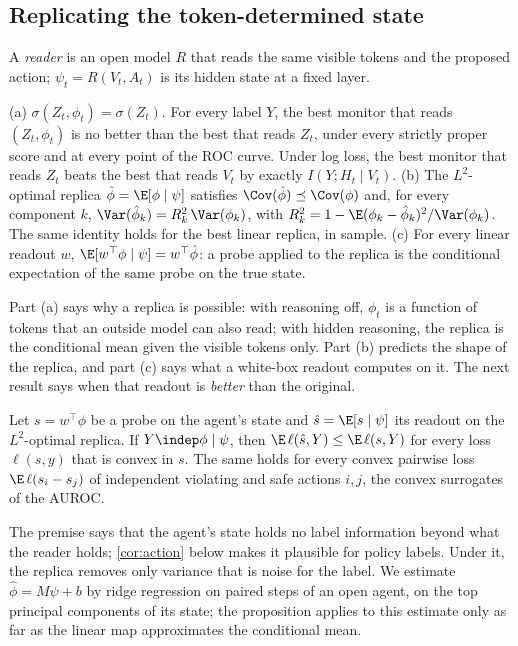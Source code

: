 \subsection{Replicating the token-determined state}
A \emph{reader} is an open model $R$ that reads the same visible tokens and the proposed action; $\psi_t=R(V_t,A_t)$ is its hidden state at a fixed layer.
\begin{proposition}\label{prop:replica}
(a) $\sigma(Z_t,\phi_t)=\sigma(Z_t)$. For every label $Y$, the best monitor that reads $(Z_t,\phi_t)$ is no better than the best that reads $Z_t$, under every strictly proper score and at every point of the ROC curve. Under log loss, the best monitor that reads $Z_t$ beats the best that reads $V_t$ by exactly $I(Y;H_t\mid V_t)$.
(b) The $L^2$-optimal replica $\hat\phi=\E[\phi\mid\psi]$ satisfies $\Cov(\hat\phi)\preceq\Cov(\phi)$ and, for every component $k$, $\Var(\hat\phi_k)=R^2_k\,\Var(\phi_k)$, with $R^2_k=1-\E(\phi_k-\hat\phi_k)^2/\Var(\phi_k)$. The same identity holds for the best linear replica, in sample.
(c) For every linear readout $w$, $\E[w^\top\phi\mid\psi]=w^\top\hat\phi$: a probe applied to the replica is the conditional expectation of the same probe on the true state.
\end{proposition}
Part (a) says why a replica is possible: with reasoning off, $\phi_t$ is a function of tokens that an outside model can also read; with hidden reasoning, the replica is the conditional mean given the visible tokens only. Part (b) predicts the shape of the replica, and part (c) says what a white-box readout computes on it. The next result says when that readout is \emph{better} than the original.
\begin{proposition}\label{prop:rb}
Let $s=w^\top\phi$ be a probe on the agent's state and $\hat s=\E[s\mid\psi]$ its readout on the $L^2$-optimal replica. If $Y\indep\phi\mid\psi$, then $\E\,\ell(\hat s,Y)\le\E\,\ell(s,Y)$ for every loss $\ell(s,y)$ that is convex in $s$. The same holds for every convex pairwise loss $\E\,\ell(s_i-s_j)$ of independent violating and safe actions $i,j$, the convex surrogates of the AUROC.
\end{proposition}
The premise says that the agent's state holds no label information beyond what the reader holds; \cref{cor:action} below makes it plausible for policy labels. Under it, the replica removes only variance that is noise for the label. We estimate $\hat\phi=M\psi+b$ by ridge regression on paired steps of an open agent, on the top principal components of its state; the proposition applies to this estimate only as far as the linear map approximates the conditional mean.

